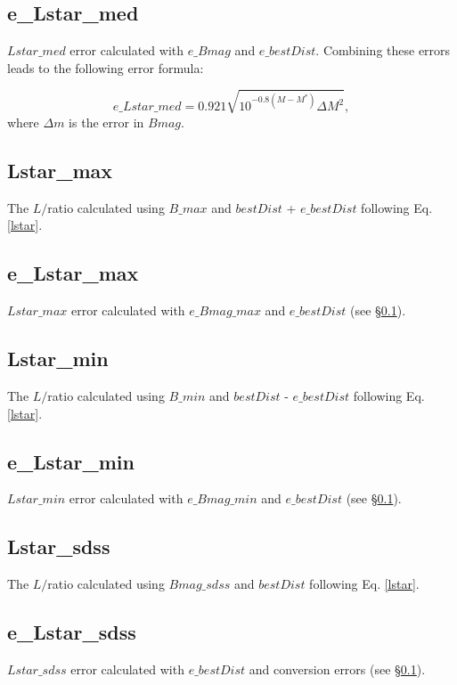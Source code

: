\subsection{e\_Lstar\_med} \label{e_Lstar_med}
$Lstar\_med$ error calculated with $e\_Bmag$ and $e\_bestDist$. Combining these errors leads to the following error formula:

\begin{equation}
	e\_Lstar\_med = 0.921 \sqrt{10^{-0.8(M - M^*)}  \Delta M^2},
\end{equation}
\noindent where $\Delta m$ is the error in $Bmag$.



\subsection{Lstar\_max}
The $L / $\Lstar  ratio calculated using $B\_max$ and $bestDist$ + $e\_bestDist$ following Eq. \ref{lstar}. \\


\subsection{e\_Lstar\_max}
$Lstar\_max$ error calculated with $e\_Bmag\_max$ and $e\_bestDist$ (see \S \ref{e_Lstar_med}).


\subsection{Lstar\_min}
The $L / $\Lstar ratio calculated using $B\_min$ and $bestDist$ - $e\_bestDist$ following Eq. \ref{lstar}.


\subsection{e\_Lstar\_min}
$Lstar\_min$ error calculated with $e\_Bmag\_min$ and $e\_bestDist$ (see \S \ref{e_Lstar_med}).


\subsection{Lstar\_sdss}
The $L / $\Lstar ratio calculated using $Bmag\_sdss$ and $bestDist$ following Eq. \ref{lstar}.


\subsection{e\_Lstar\_sdss}
$Lstar\_sdss$ error calculated with $e\_bestDist$ and \cite{jester2005} conversion errors (see \S \ref{e_Lstar_med}).


